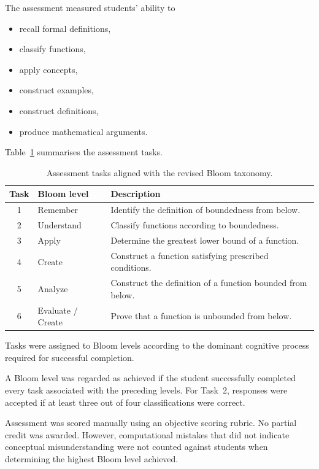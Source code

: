 \documentclass[11pt]{article}
\begin{document}
The assessment measured students' ability to

\begin{itemize}
\item recall formal definitions,
\item classify functions,
\item apply concepts,
\item construct examples,
\item construct definitions,
\item produce mathematical arguments.
\end{itemize}

Table~\ref{tab:assessment} summarises the assessment tasks.

\begin{table}[H]
\centering
\caption{Assessment tasks aligned with the revised Bloom taxonomy.}
\label{tab:assessment}

\begin{tabular}{clp{8cm}}
\toprule
Task & Bloom level & Description\\
\midrule
1 & Remember &
Identify the definition of boundedness from below.\\

2 & Understand &
Classify functions according to boundedness.\\

3 & Apply &
Determine the greatest lower bound of a function.\\

4 & Create &
Construct a function satisfying prescribed conditions.\\

5 & Analyze &
Construct the definition of a function bounded from below.\\

6 & Evaluate / Create &
Prove that a function is unbounded from below.\\
\bottomrule
\end{tabular}

\end{table}

Tasks were assigned to Bloom levels according to the dominant cognitive process required for successful completion.

A Bloom level was regarded as achieved if the student successfully completed every task associated with the preceding levels. For Task~2, responses were accepted if at least three out of four classifications were correct.

Assessment was scored manually using an objective scoring rubric. No partial credit was awarded. However, computational mistakes that did not indicate conceptual misunderstanding were not counted against students when determining the highest Bloom level achieved.
\end{document}
